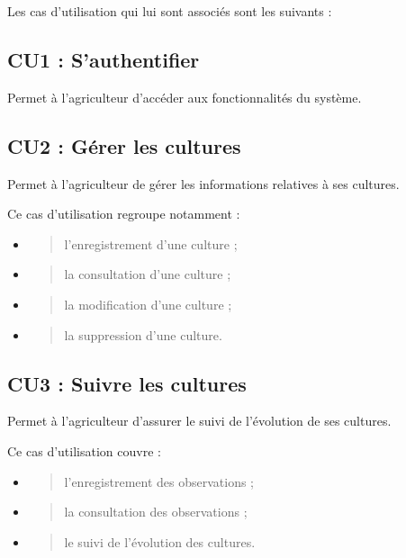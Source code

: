\documentclass[
]{book}
\begin{document}
Les cas d'utilisation qui lui sont associés sont les suivants :

\hypertarget{cu1-sauthentifier}{%
\subsection{CU1 : S'authentifier}\label{cu1-sauthentifier}}

Permet à l'agriculteur d'accéder aux fonctionnalités du système.

\hypertarget{cu2-guxe9rer-les-cultures}{%
\subsection{CU2 : Gérer les cultures}\label{cu2-guxe9rer-les-cultures}}

Permet à l'agriculteur de gérer les informations relatives à ses
cultures.

Ce cas d'utilisation regroupe notamment :

\begin{itemize}
\item
  \begin{quote}
  l'enregistrement d'une culture ;
  \end{quote}
\item
  \begin{quote}
  la consultation d'une culture ;
  \end{quote}
\item
  \begin{quote}
  la modification d'une culture ;
  \end{quote}
\item
  \begin{quote}
  la suppression d'une culture.
  \end{quote}
\end{itemize}

\hypertarget{cu3-suivre-les-cultures}{%
\subsection{CU3 : Suivre les cultures}\label{cu3-suivre-les-cultures}}

Permet à l'agriculteur d'assurer le suivi de l'évolution de ses
cultures.

Ce cas d'utilisation couvre :

\begin{itemize}
\item
  \begin{quote}
  l'enregistrement des observations ;
  \end{quote}
\item
  \begin{quote}
  la consultation des observations ;
  \end{quote}
\item
  \begin{quote}
  le suivi de l'évolution des cultures.
  \end{quote}
\end{itemize}
\end{document}
